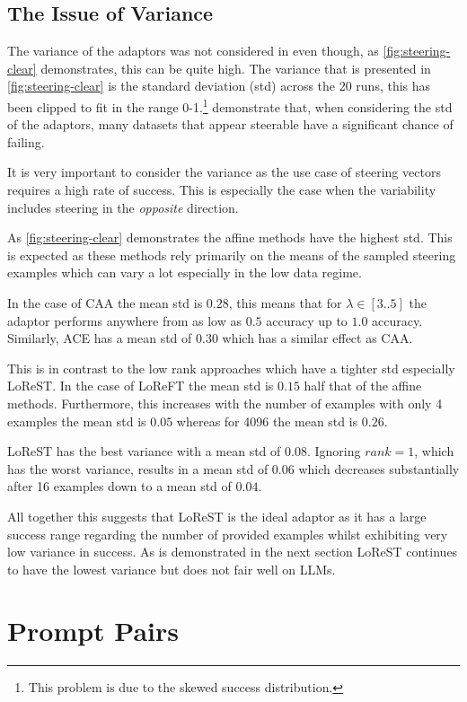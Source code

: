 \subsection{The Issue of Variance}

The variance of the adaptors was not considered in \citet{steering-clear} even though, as \cref{fig:steering-clear} demonstrates, this can be quite high.
The variance that is presented in \cref{fig:steering-clear} is the standard deviation (std) across the 20 runs, this has been clipped to fit in the range 0-1.\footnote{This problem is due to the skewed success distribution.}
\citet{steerability} demonstrate that, when considering the std of the adaptors, many datasets that appear steerable have a significant chance of failing.

It is very important to consider the variance as the use case of steering vectors requires a high rate of success.
This is especially the case when the variability includes steering in the \emph{opposite} direction.

As \cref{fig:steering-clear} demonstrates the affine methods have the highest std.
This is expected as these methods rely primarily on the means of the sampled steering examples which can vary a lot especially in the low data regime.

In the case of CAA the mean std is $0.28$, this means that for $\lambda \in [3..5]$ the adaptor performs anywhere from as low as $0.5$ accuracy up to $1.0$ accuracy.
Similarly, ACE has a mean std of $0.30$ which has a similar effect as CAA.

This is in contrast to the low rank approaches which have a tighter std especially LoReST.
In the case of LoReFT the mean std is $0.15$ half that of the affine methods.
Furthermore, this increases with the number of examples with only 4 examples the mean std is $0.05$ whereas for 4096 the mean std is $0.26$.

LoReST has the best variance with a mean std of $0.08$.
Ignoring $rank=1$, which has the worst variance, results in a mean std of $0.06$ which decreases substantially after 16 examples down to a mean std of $0.04$.

All together this suggests that LoReST is the ideal adaptor as it has a large success range regarding the number of provided examples whilst exhibiting very low variance in success.
As is demonstrated in the next section LoReST continues to have the lowest variance but does not fair well on LLMs.

\section{Prompt Pairs}
\label{sec:prompt-pairs-res}

